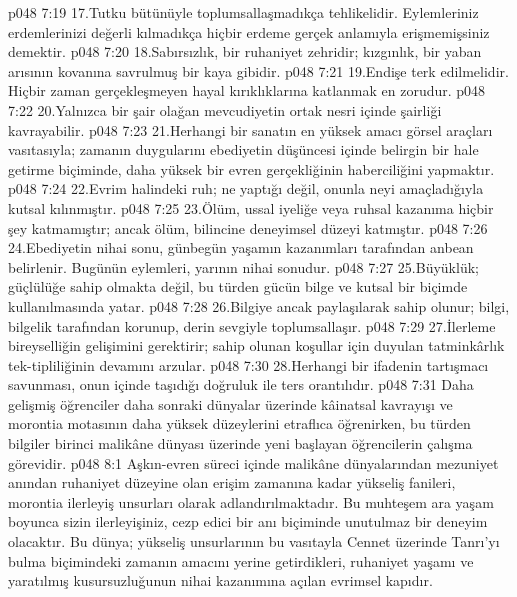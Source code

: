 \vs p048 7:19 17.\bibnobreakspace Tutku bütünüyle toplumsallaşmadıkça tehlikelidir. Eylemleriniz erdemlerinizi değerli kılmadıkça hiçbir erdeme gerçek anlamıyla erişmemişsiniz demektir.
\vs p048 7:20 18.\bibnobreakspace Sabırsızlık, bir ruhaniyet zehridir; kızgınlık, bir yaban arısının kovanına savrulmuş bir kaya gibidir.
\vs p048 7:21 19.\bibnobreakspace Endişe terk edilmelidir. Hiçbir zaman gerçekleşmeyen hayal kırıklıklarına katlanmak en zorudur.
\vs p048 7:22 20.\bibnobreakspace Yalnızca bir şair olağan mevcudiyetin ortak nesri içinde şairliği kavrayabilir.
\vs p048 7:23 21.\bibnobreakspace Herhangi bir sanatın en yüksek amacı görsel araçları vasıtasıyla; zamanın duygularını ebediyetin düşüncesi içinde belirgin bir hale getirme biçiminde, daha yüksek bir evren gerçekliğinin haberciliğini yapmaktır.
\vs p048 7:24 22.\bibnobreakspace Evrim halindeki ruh; ne yaptığı değil, onunla neyi amaçladığıyla kutsal kılınmıştır.
\vs p048 7:25 23.\bibnobreakspace Ölüm, ussal iyeliğe veya ruhsal kazanıma hiçbir şey katmamıştır; ancak ölüm,  bilincine deneyimsel düzeyi katmıştır.
\vs p048 7:26 24.\bibnobreakspace Ebediyetin nihai sonu, günbegün yaşamın kazanımları tarafından anbean belirlenir. Bugünün eylemleri, yarının nihai sonudur.
\vs p048 7:27 25.\bibnobreakspace Büyüklük; güçlülüğe sahip olmakta değil, bu türden gücün bilge ve kutsal bir biçimde kullanılmasında yatar.
\vs p048 7:28 26.\bibnobreakspace Bilgiye ancak paylaşılarak sahip olunur; bilgi, bilgelik tarafından korunup, derin sevgiyle toplumsallaşır.
\vs p048 7:29 27.\bibnobreakspace İlerleme bireyselliğin gelişimini gerektirir; sahip olunan koşullar için duyulan tatminkârlık tek\hyp{}tipliliğinin devamını arzular.
\vs p048 7:30 28.\bibnobreakspace Herhangi bir ifadenin tartışmacı savunması, onun içinde taşıdığı doğruluk ile ters orantılıdır.
\vs p048 7:31 Daha gelişmiş öğrenciler daha sonraki dünyalar üzerinde kâinatsal kavrayışı ve morontia motasının daha yüksek düzeylerini etraflıca öğrenirken, bu türden bilgiler birinci malikâne dünyası üzerinde yeni başlayan öğrencilerin çalışma görevidir.
\vs p048 8:1 Aşkın\hyp{}evren süreci içinde malikâne dünyalarından mezuniyet anından ruhaniyet düzeyine olan erişim zamanına kadar yükseliş fanileri, morontia ilerleyiş unsurları olarak adlandırılmaktadır. Bu muhteşem ara yaşam boyunca sizin ilerleyişiniz, cezp edici bir anı biçiminde unutulmaz bir deneyim olacaktır. Bu dünya; yükseliş unsurlarının bu vasıtayla Cennet üzerinde Tanrı’yı bulma biçimindeki zamanın amacını yerine getirdikleri, ruhaniyet yaşamı ve yaratılmış kusursuzluğunun nihai kazanımına açılan evrimsel kapıdır.

